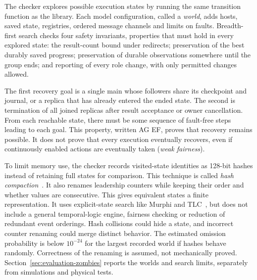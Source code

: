 The checker explores possible execution states by running the same
transition function as the library. Each model configuration, called a
\emph{world}, adds hosts, saved state, registries, ordered message channels
and limits on faults. Breadth-first search checks four safety invariants,
properties that must hold in every explored state: the result-count bound
under redirects; preservation of the best durably saved progress;
preservation of durable observations somewhere until the group ends; and reporting of every role change, with only permitted changes allowed.

The first recovery goal is a single main whose followers share its
checkpoint and journal, or a replica that has already entered the ended
state. The second is termination of all joined replicas after result
acceptance or owner cancellation. From each reachable state, there must
be some sequence of fault-free steps leading to each goal. This property,
written AG EF, proves that recovery remains possible. It does not prove
that every execution eventually recovers, even if continuously enabled
actions are eventually taken (\emph{weak fairness}).

To limit memory use, the checker records visited-state identities as
128-bit hashes instead of retaining full states for comparison. This
technique is called \emph{hash compaction}~\cite{stern1995hashCompaction}. It also renames leadership
counters while keeping their order and whether values are consecutive.
This gives equivalent states a finite representation. It uses explicit-state search like Murphi and
TLC~\cite{yu1999tlc}, but does not include a general temporal-logic engine,
fairness checking or reduction of redundant event orderings.
Hash collisions could hide a state, and incorrect counter renaming could
merge distinct behavior. The estimated omission probability is below
$10^{-24}$ for the largest recorded world if hashes behave randomly.
Correctness of the renaming is assumed, not mechanically proved.
Section~\ref{sec:evaluation-zombies} reports the worlds and search limits,
separately from simulations and physical tests.
